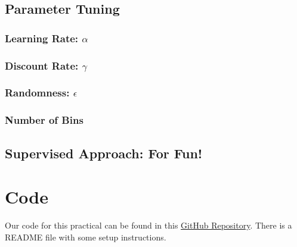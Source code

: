 \documentclass[10pt]{article}
\begin{document}
\subsection{Parameter Tuning}

\subsubsection{Learning Rate: $\alpha$}

\subsubsection{Discount Rate: $\gamma$}

\subsubsection{Randomness: $\epsilon$}

\subsubsection{Number of Bins}

\subsection{Supervised Approach: For Fun!}

\section{Code}

Our code for this practical can be found in this
\href{https://github.com/victordomene/cs181-practicals/tree/master/practical4}{GitHub
Repository}. There is a README file with some setup instructions.
\end{document}
